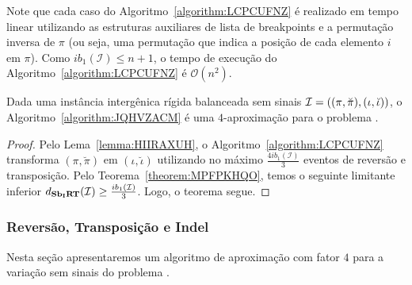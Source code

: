 Note que cada caso do Algoritmo~\ref{algorithm:LCPCUFNZ} é realizado em tempo linear utilizando as estruturas auxiliares de lista de breakpoints e a permutação inversa de $\pi$ (ou seja, uma permutação que indica a posição de cada elemento $i$ em $\pi$). Como $ib_1(\mathcal{I}) \le n + 1$, o tempo de execução do Algoritmo~\ref{algorithm:LCPCUFNZ} é $\mathcal{O}(n^2)$.

\begin{theorem}\label{theorem:USRSHCGH}
Dada uma instância intergênica rígida balanceada sem sinais $\mathcal{I}=\break((\pi,\breve\pi),(\iota,\breve\iota))$, o Algoritmo~\ref{algorithm:JQHVZACM} é uma $4$-aproximação para o problema \SbIRT{}.
\end{theorem}
\begin{proof}
Pelo Lema~\ref{lemma:HIIRAXUH}, o Algoritmo~\ref{algorithm:LCPCUFNZ} transforma $(\pi,\breve\pi)$ em $(\iota,\breve\iota)$ utilizando no máximo $\frac{4ib_1(\mathcal{I})}{3}$ eventos de reversão e transposição. Pelo Teorema~\ref{theorem:MPFPKHQO}, temos o seguinte limitante inferior $d_{\textbf{Sb\textsubscript{I}RT}}(\mathcal{I}) \ge \frac{ib_1(\mathcal{I})}{3}$. Logo, o teorema segue. 
\end{proof}

\subsubsection{Reversão, Transposição e Indel}

Nesta seção apresentaremos um algoritmo de aproximação com fator $4$ para a variação sem sinais do problema \SbIRTI{}. 

